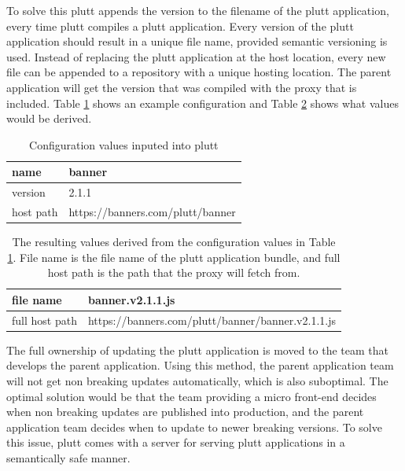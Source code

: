 To solve this plutt appends the version to the filename of the plutt application, every time plutt compiles a plutt application. Every version of the plutt application should result in a unique file name, provided semantic versioning is used. Instead of replacing the plutt application at the host location, every new file can be appended to a repository with a unique hosting location. The parent application will get the version that was compiled with the proxy that is included. Table \ref{table:plutt-configuration} shows an example configuration and Table \ref{table:plutt-configuration-result} shows what values would be derived.

\begin{table}
\centering
\caption{Configuration values inputed into plutt}
\label{table:plutt-configuration}
\begin{tabular}{|l|l|}
\hline
name      & banner                           \\ \hline
version   & 2.1.1                            \\ \hline
host path & https://banners.com/plutt/banner \\ \hline
\end{tabular}
\end{table}

\begin{table}
\centering
\caption{The resulting values derived from the configuration values in Table \ref{table:plutt-configuration}. File name is the file name of the plutt application bundle, and full host path is the path that the proxy will fetch from.}
\label{table:plutt-configuration-result}
\begin{tabular}{|l|l|}
\hline
file name      & banner.v2.1.1.js                                  \\ \hline
full host path & https://banners.com/plutt/banner/banner.v2.1.1.js \\ \hline
\end{tabular}
\end{table}

The full ownership of updating the plutt application is moved to the team that develops the parent application. Using this method, the parent application team will not get non breaking updates automatically, which is also suboptimal. The optimal solution would be that the team providing a micro front-end decides when non breaking updates are published into production, and the parent application team decides when to update to newer breaking versions. To solve this issue, plutt comes with a server for serving plutt applications in a semantically safe manner.

